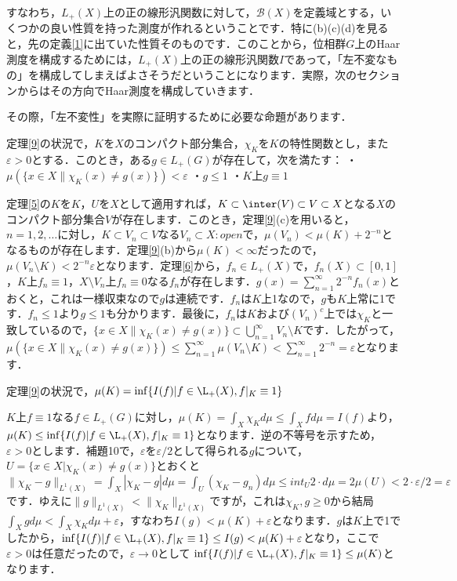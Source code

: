 すなわち，$L_{+}(X)$上の正の線形汎関数に対して，$\mathscr{B}(X)$を定義域とする，いくつかの良い性質を持った測度が作れるということです．特に(b)(c)(d)を見ると，先の定義\ref{1}に出ていた性質そのものです．このことから，位相群$G$上のHaar測度を構成するためには，$L_{+}(X)$上の正の線形汎関数$I$であって，「左不変なもの」を構成してしまえばよさそうだということになります．実際，次のセクションからはその方向でHaar測度を構成していきます．

その際，「左不変性」を実際に証明するために必要な命題があります．

\begin{lem}\label{10}
定理\ref{9}の状況で，$K$を$X$のコンパクト部分集合，$\chi_{K}$を$K$の特性関数とし，また$\varepsilon >0$とする．このとき，ある$g \in L_{+}(G)$が存在して，次を満たす：
・$\mu ( \{ x \in X \| \chi_{K}(x) \neq g(x) \} ) < \varepsilon $
・$g \le 1$
・$K$上$g \equiv 1$
\end{lem}
\begin{Proof}
定理\ref{5}の$K$を$K$，$U$を$X$として適用すれば，$K \subset \inter(V) \subset V \subset X$となる$X$のコンパクト部分集合$V$が存在します．このとき，定理\ref{9}(c)を用いると，$n=1,2,\ldots$に対し，$K \subset V_n \subset V$なる$V_n \subset X \colon open$で，$\mu(V_n) < \mu(K) + 2^{-n}$となるものが存在します．定理\ref{9}(b)から$\mu(K)<\infty$だったので，$\mu(V_n \setminus K) < 2^{-n}\varepsilon$となります．定理\ref{6}から，$f_n \in L_{+}(X)$で，$f_n(X) \subset [0,1]$，$K$上$f_n \equiv 1$，$X \setminus V_n$上$f_n \equiv 0$なる$f_n$が存在します．$g(x)=\sum_{n=1}^{\infty}2^{-n}f_n(x)$とおくと，これは一様収束なので$g$は連続です．$f_n$は$K$上1なので，$g$も$K$上常に1です．$f_n \le 1$より$g \le 1$も分かります．最後に，$f_n$は$K$および$(V_n)^{c}$上では$\chi_{K}$と一致しているので，$\{ x \in X \| \chi_{K}(x) \neq g(x) \} \subset \bigcup_{n=1}^{\infty}V_n \setminus K$です．したがって，$\mu( \{ x \in X \| \chi_{K}(x) \neq g(x) \} ) \le \sum_{n=1}^{\infty} \mu(V_n \setminus K) < \sum_{n=1}^{\infty}2^{-n}=\varepsilon$となります．
\end{Proof}
\begin{prop}\label{11}
定理\ref{9}の状況で，$\mu(K)= \inf \{ I(f) | f \in \L_{+}(X), f|_{K} \equiv 1 \}$
\end{prop}
\begin{Proof}
$K$上$f \equiv 1$なる$f \in L_{+}(G)$に対し，$ \mu(K)=\int_{X}\chi_K d\mu \le \int_{X}f d\mu=I(f)$より，$\mu(K) \le \inf \{ I(f) | f \in \L_{+}(X), f|_{K} \equiv 1 \}$となります．逆の不等号を示すため，$\varepsilon>0$とします．補題10で，$\varepsilon$を$\varepsilon /2$として得られる$g$について，$U=\{ x \in X | \chi_{K}(x) \neq g(x) \}$とおくと$\| \chi_{K}-g\| _{L^1(X)} = \int_{X}|\chi_K-g|d\mu = \int_{U}(\chi_K-g_n)d\mu \le int_{U}2 \cdot d\mu=2\mu(U)<2 \cdot \varepsilon / 2=\varepsilon$です．ゆえに$\| g\| _{L^1(X)} < \| \chi_{K} \| _{L^1(X)} $ですが，これは$\chi_K, g \ge 0$から結局 $\int_{X}gd\mu < \int_{X}\chi_{K}d\mu +\varepsilon$，すなわち$I(g)<\mu (K)+\varepsilon$となります．$g$は$K$上で1でしたから，$\inf \{ I(f) | f \in \L_{+}(X), f|_{K} \equiv 1 \} \le I(g) <\mu (K)+\varepsilon$となり，ここで$\varepsilon>0$は任意だったので，$\varepsilon \to 0$として $\inf \{ I(f) | f \in \L_{+}(X), f|_{K} \equiv 1 \} \le \mu (K)$となります．
\end{Proof}
